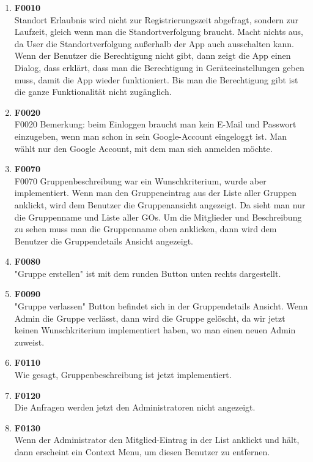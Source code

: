 \documentclass[11pt,a4paper]{scrartcl}
\begin{document}
\begin{enumerate}
	\item \textbf{F0010}\\Standort Erlaubnis wird nicht zur Registrierungszeit abgefragt, sondern zur Laufzeit, gleich wenn man die Standortverfolgung braucht. Macht nichts aus, da User die Standortverfolgung außerhalb der App auch ausschalten kann.
Wenn der Benutzer die Berechtigung nicht gibt, dann zeigt die App einen Dialog, dass erklärt, dass man die Berechtigung in Geräteeinstellungen geben muss, damit die App wieder funktioniert. Bis man die Berechtigung gibt ist die ganze Funktionalität nicht zugänglich.
\item \textbf{F0020}\\
F0020 Bemerkung: beim Einloggen braucht man kein E-Mail und Passwort einzugeben, wenn man schon in sein Google-Account eingeloggt ist. Man wählt nur den Google Account, mit dem man sich anmelden möchte.
\item \textbf{F0070}\\
F0070 Gruppenbeschreibung war ein Wunschkriterium, wurde aber implementiert.
Wenn man den Gruppeneintrag aus der Liste aller Gruppen anklickt, wird dem Benutzer die Gruppenansicht angezeigt. Da sieht man nur die Gruppenname und Liste aller GOs. Um die Mitglieder und Beschreibung zu sehen muss man die Gruppenname oben anklicken, dann wird dem Benutzer die Gruppendetails Ansicht angezeigt.

\item \textbf{F0080}\\ "Gruppe erstellen" ist mit dem runden Button unten rechts dargestellt.

\item \textbf{F0090}\\ "Gruppe verlassen" Button befindet sich in der Gruppendetails Ansicht. Wenn Admin die Gruppe verlässt, dann wird die Gruppe gelöscht, da wir jetzt keinen Wunschkriterium implementiert haben, wo man einen neuen Admin zuweist.

\item \textbf{F0110}\\ Wie gesagt, Gruppenbeschreibung ist jetzt implementiert.

 \item \textbf{F0120}\\ Die Anfragen werden jetzt den Administratoren nicht angezeigt.

\item \textbf{F0130}\\ Wenn der Administrator den Mitglied-Eintrag in der List anklickt und hält, dann erscheint ein Context Menu, um diesen Benutzer zu entfernen.


\end{enumerate}
\end{document}
